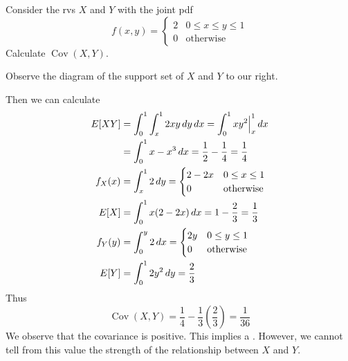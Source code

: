 \documentclass[notoc,notitlepage]{tufte-book}
\DeclareMathOperator{\Cov}{Cov }
\begin{document}
\begin{eg}[Example 3.17]
  Consider the rvs $X$ and $Y$ with the joint pdf
  \begin{equation*}
    f(x, y) = \begin{cases}
      2 & 0 \leq x \leq y \leq 1 \\
      0 & \text{otherwise}
    \end{cases}
  \end{equation*}
  Calculate $\Cov(X, Y)$.

  \begin{solution}
  Observe the diagram of the support set of $X$ and $Y$ to our right.

  Then we can calculate
  \begin{align*}
    E[ XY ]  & = \int_{0}^{1} \int_{x}^{1} 2xy \dif{y} \dif{x} = \int_{0}^{1} xy^2 \at{x}{1} \dif{x} \\
             & = \int_{0}^{1} x - x^3 \dif{x} = \frac{1}{2} - \frac{1}{4} = \frac{1}{4} \\
    f_X(x)   & = \int_{x}^{1} 2 \dif{y} = \begin{cases}
                  2 - 2x & 0 \leq x \leq 1 \\
                  0      & \text{otherwise}
                \end{cases} \\
    E[X]     & = \int_{0}^{1} x (2 - 2x) \dif{x} = 1 - \frac{2}{3} = \frac{1}{3}\\
    f_Y(y)   & = \int_{0}^{y} 2 \dif{x} = \begin{cases}
                  2y & 0 \leq y \leq 1 \\
                  0  & \text{otherwise}
                \end{cases} \\
    E[Y]     & = \int_{0}^{1} 2y^2 \dif{y} = \frac{2}{3}
  \end{align*}
  Thus
  \begin{equation*}
    \Cov(X, Y) = \frac{1}{4} - \frac{1}{3} \left( \frac{2}{3} \right) = \frac{1}{36}
  \end{equation*}
  We observe that the covariance is positive. This implies a . However, we cannot tell from this value the strength of the relationship between $X$ and $Y$.
  \end{solution}
\end{eg}
\end{document}
